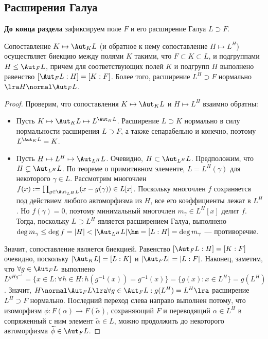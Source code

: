 \subsection{Расширения Галуа}

\textbf{До конца раздела} зафиксируем поле $F$ и его расширение Галуа $L \supset F$.

\begin{theorem}
	Сопоставление $K \mapsto \Aut_{K}L$ (и обратное к нему сопоставление $H \mapsto L^H$) осуществляет биекцию между полями $K$ такими, что $F \subset K \subset L$, и подгруппами $H \le \Aut_F{L}$, причем для соответствующих полей $K$ и подгрупп $H$ выполнено равенство $[\Aut_FL : H] = [K : F]$. Более того, расширение $L^H \supset F$ нормально $\lra H \normal \Aut_F{L}$.
\end{theorem}

\begin{proof}
	Проверим, что сопоставления $K \mapsto \Aut_{K}L$ и $H \mapsto L^H$ взаимно обратны:
	\begin{itemize}
		\item Пусть $K \mapsto \Aut_{K}L \mapsto L^{\Aut_{K}L}$. Расширение $L \supset K$ нормально в силу нормальности расширения $L \supset F$, а также сепарабельно и конечно, поэтому $L^{\Aut_K{L}} = K$.
		\item Пусть $H \mapsto L^H \mapsto \Aut_{L^H}L$. Очевидно, $H \subset \Aut_{L^H}L$. Предположим, что $H \subsetneq \Aut_{L^H}L$. По теореме о примитивном элементе, $L = L^H(\gamma)$ для некоторого $\gamma \in L$. Рассмотрим многочлен $f(x) := \prod_{g \in \Aut_{L^H}L}(x - g(\gamma)) \in L[x]$. Поскольку многочлен $f$ сохраняется под действием любого автоморфизма из $H$, все его коэффициенты лежат в $L^H$. Но $f(\gamma) = 0$, поэтому минимальный многочлен $m_\gamma \in L^H[x]$ делит $f$. Тогда, поскольку $L \supset L^H$ является расширением Галуа, выполнено $\deg{m_\gamma} \le \deg{f} = |H| < |\Aut_{L^H}L| \hm= [L : H] = \deg{m_\gamma}$ --- противоречие.
	\end{itemize}
	
	Значит, сопоставление является биекцией. Равенство $[\Aut_FL : H] = [K : F]$ очевидно, поскольку $|\Aut_KL| = [L : K]$ и $|\Aut_FL| = |L : F|$. Наконец, заметим, что $\forall g \in \Aut_FL$ выполнено $L^{gHg^{-1}} = \{x \in L: \forall h \in H: h(g^{-1}(x)) = g^{-1}(x)\}= \{g(x) : x \in L^H\} = g(L^H)$. Значит, $H \normal \Aut_FL \lra \forall g \in \Aut_FL: g(L^H) = L^H \lra$ расширение $L^H \supset F$ нормально. Последний переход слева направо выполнен потому, что изоморфизм $\phi: F(\alpha) \to F(\widetilde\alpha)$, сохраняющий $F$ и переводящий $\alpha \in L^H$ в сопряженный с ним элемент $\widetilde\alpha \in L$, можно продолжить до некоторого автоморфизма $\widetilde\phi \in \Aut_FL$.
\end{proof}